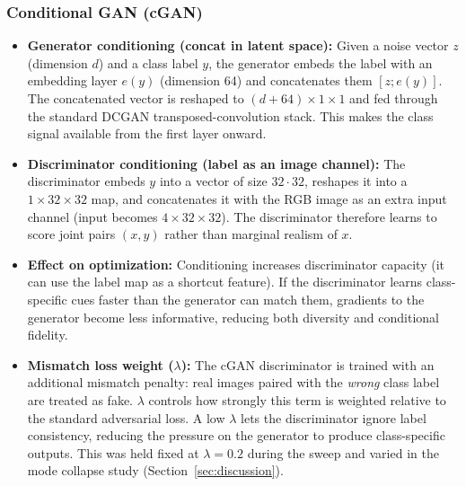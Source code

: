 \documentclass[runningheads]{llncs}
\begin{document}
\subsubsection{Conditional GAN (cGAN)}
\begin{itemize}
    \item \textbf{Generator conditioning (concat in latent space):} Given a noise vector $z$ (dimension $d$) and a class label $y$, the generator embeds the label with an embedding layer $e(y)$ (dimension 64) and concatenates them $[z; e(y)]$. The concatenated vector is reshaped to $(d+64)\times 1\times 1$ and fed through the standard DCGAN transposed-convolution stack. This makes the class signal available from the first layer onward.
    \item \textbf{Discriminator conditioning (label as an image channel):} The discriminator embeds $y$ into a vector of size $32\cdot 32$, reshapes it into a $1\times 32\times 32$ map, and concatenates it with the RGB image as an extra input channel (input becomes $4\times 32\times 32$). The discriminator therefore learns to score joint pairs $(x,y)$ rather than marginal realism of $x$.
    \item \textbf{Effect on optimization:} Conditioning increases discriminator capacity (it can use the label map as a shortcut feature). If the discriminator learns class-specific cues faster than the generator can match them, gradients to the generator become less informative, reducing both diversity and conditional fidelity.
    \item \textbf{Mismatch loss weight ($\lambda$):} The cGAN discriminator is trained with an additional mismatch penalty: real images paired with the \emph{wrong} class label are treated as fake. $\lambda$ controls how strongly this term is weighted relative to the standard adversarial loss. A low $\lambda$ lets the discriminator ignore label consistency, reducing the pressure on the generator to produce class-specific outputs. This was held fixed at $\lambda=0.2$ during the sweep and varied in the mode collapse study (Section~\ref{sec:discussion}).
\end{itemize}
\end{document}
